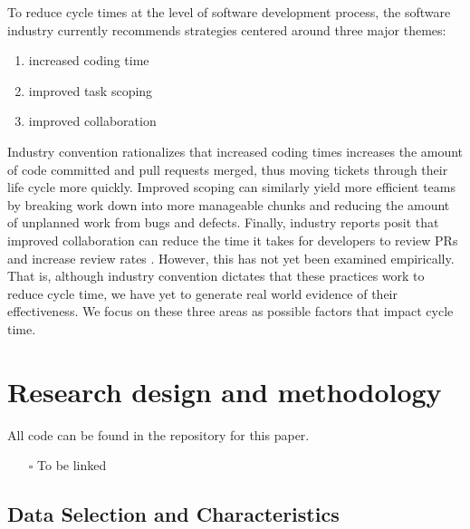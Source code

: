 \documentclass[
  sn-mathphys-ay,
]{sn-jnl}
\providecommand{\tightlist}{%
  \setlength{\itemsep}{0pt}\setlength{\parskip}{0pt}}\usepackage{longtable,booktabs,array}
\begin{document}
To reduce cycle times at the level of software development process, the
software industry currently recommends strategies centered around three
major themes:

\begin{enumerate}
\def\labelenumi{\arabic{enumi}.}
\tightlist
\item
  increased coding time
\item
  improved task scoping
\item
  improved collaboration
\end{enumerate}

Industry convention rationalizes that increased coding times increases
the amount of code committed and pull requests merged, thus moving
tickets through their life cycle more quickly. Improved scoping can
similarly yield more efficient teams by breaking work down into more
manageable chunks and reducing the amount of unplanned work from bugs
and defects. Finally, industry reports posit that improved collaboration
can reduce the time it takes for developers to review PRs and increase
review rates
\citep{flowHowIncreaseSoftware, gralhaReduceCycleTime2022, waydevCycleTimeFormula2021}.
However, this has not yet been examined empirically. That is, although
industry convention dictates that these practices work to reduce cycle
time, we have yet to generate real world evidence of their
effectiveness. We focus on these three areas as possible factors that
impact cycle time.

\section{Research design and
methodology}\label{research-design-and-methodology}

All code can be found in the repository for this paper.

\begin{itemize}
\tightlist
\item[$\square$]
  To be linked
\end{itemize}

\subsection{Data Selection and
Characteristics}\label{data-selection-and-characteristics}
\end{document}
